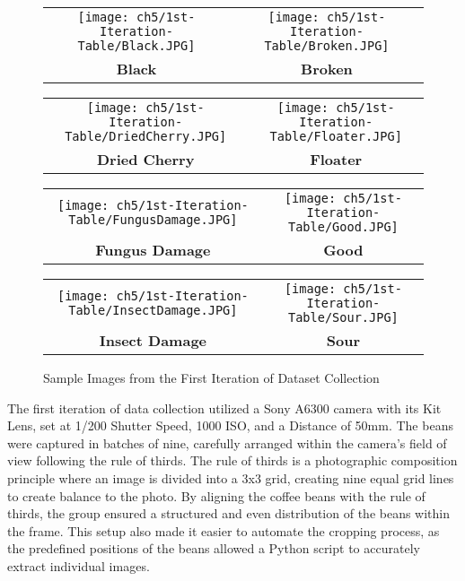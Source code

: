 \begin{figure}[H]
	\centering
	\begin{tabular}{cc}
		\texttt{[image: ch5/1st-Iteration-Table/Black.JPG]} &
		\texttt{[image: ch5/1st-Iteration-Table/Broken.JPG]} \\
		\textbf{Black}  & \textbf{Broken} \\[6pt]
	\end{tabular}
	\begin{tabular}{cc}
		\texttt{[image: ch5/1st-Iteration-Table/DriedCherry.JPG]} &
		\texttt{[image: ch5/1st-Iteration-Table/Floater.JPG]} \\
		\textbf{Dried Cherry}  & \textbf{Floater} \\[6pt]
	\end{tabular}
	\begin{tabular}{cc}
		\texttt{[image: ch5/1st-Iteration-Table/FungusDamage.JPG]} &
		\texttt{[image: ch5/1st-Iteration-Table/Good.JPG]} \\
		\textbf{Fungus Damage}  & \textbf{Good} \\[6pt]
	\end{tabular}
	\begin{tabular}{cc}
		\texttt{[image: ch5/1st-Iteration-Table/InsectDamage.JPG]} &
		\texttt{[image: ch5/1st-Iteration-Table/Sour.JPG]} \\
		\textbf{Insect Damage}  & \textbf{Sour} \\[6pt]
	\end{tabular}
	\caption{Sample Images from the First Iteration of Dataset Collection}
\end{figure}


The first iteration of data collection utilized a Sony A6300 camera with its Kit Lens, set at 1/200 Shutter Speed, 1000 ISO, and a Distance of 50mm. The beans were captured in batches of nine, carefully arranged within the camera's field of view following the rule of thirds. The rule of thirds is a photographic composition principle where an image is divided into a 3x3 grid, creating nine equal grid lines to create balance to the photo. By aligning the coffee beans with the rule of thirds, the group ensured a structured and even distribution of the beans within the frame. This setup also made it easier to automate the cropping process, as the predefined positions of the beans allowed a Python script to accurately extract individual images.

